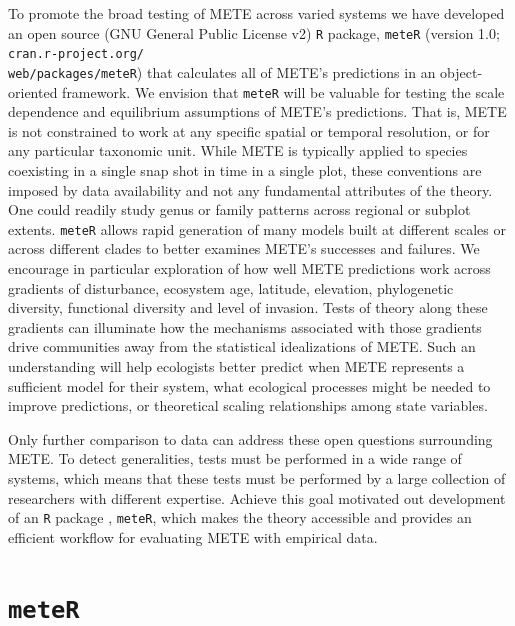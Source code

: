 To promote the broad testing of METE across varied systems we have
developed an open source (GNU General Public License v2) \texttt{R}
package, \texttt{meteR} (version 1.0;
\texttt{cran.r-project.org/\\web/packages/meteR}) that calculates all of
METE's predictions in an object-oriented framework. We envision that
\texttt{meteR} will be valuable for testing the scale dependence and
equilibrium assumptions of METE's predictions. That is, METE is not
constrained to work at any specific spatial or temporal resolution, or
for any particular taxonomic unit. While METE is typically applied to
species coexisting in a single snap shot in time in a single plot,
these conventions are imposed by data availability and not any
fundamental attributes of the theory. One could readily study genus or
family patterns across regional or subplot extents. \texttt{meteR}
allows rapid generation of many models built at different scales or
across different clades to better examines METE's successes and
failures. We encourage in particular exploration of how well METE
predictions work across gradients of disturbance, ecosystem age,
latitude, elevation, phylogenetic diversity, functional diversity and
level of invasion. Tests of theory along these gradients can
illuminate how the mechanisms associated with those gradients drive
communities away from the statistical idealizations of METE. Such an
understanding will help ecologists better predict when METE represents
a sufficient model for their system, what ecological processes might
be needed to improve predictions, or theoretical scaling relationships
among state variables.

Only further comparison to data can address these open questions
surrounding METE. To detect generalities, tests must be performed in a
wide range of systems, which means that these tests must be performed
by a large collection of researchers with different expertise. Achieve
this goal motivated out development of an \texttt{R} package
\citep{RDevelopmentCoreTeam2013}, \texttt{meteR}, which makes the theory
accessible and provides an efficient workflow for evaluating METE with
empirical data.


\section{\texttt{meteR}}


